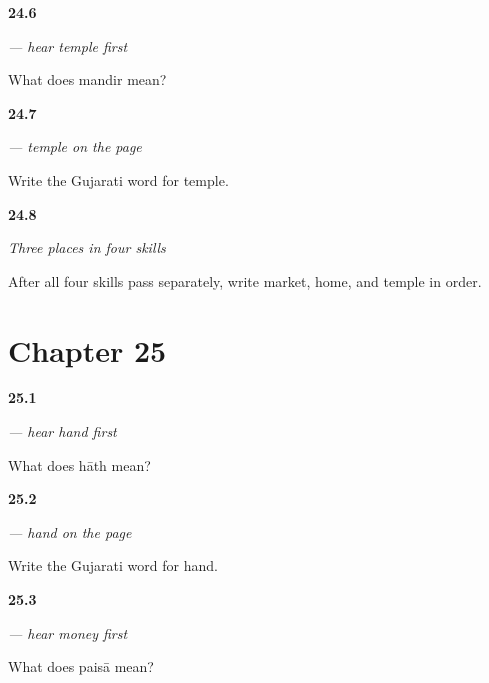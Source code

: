 \noindent\begin{minipage}[t]{\linewidth}
\raggedright
\hypertarget{review-GU-C20-hear-mandir-recall}{\textbf{24.6}} \emph{ — hear temple first}\par
\small What does mandir mean?
\end{minipage}\par\medskip

\noindent\begin{minipage}[t]{\linewidth}
\raggedright
\hypertarget{review-GU-C20-mandir-write}{\textbf{24.7}} \emph{ — temple on the page}\par
\small Write the Gujarati word for temple.
\end{minipage}\par\medskip

\noindent\begin{minipage}[t]{\linewidth}
\raggedright
\hypertarget{review-GU-C20-places-three-payoff}{\textbf{24.8}} \emph{Three places in four skills}\par
\small After all four skills pass separately, write market, home, and temple in order.
\end{minipage}\par\medskip

\section*{Chapter 25}

\noindent\begin{minipage}[t]{\linewidth}
\raggedright
\hypertarget{review-GU-C21-hear-haath-recall}{\textbf{25.1}} \emph{ — hear hand first}\par
\small What does hāth mean?
\end{minipage}\par\medskip

\noindent\begin{minipage}[t]{\linewidth}
\raggedright
\hypertarget{review-GU-C21-haath-write}{\textbf{25.2}} \emph{ — hand on the page}\par
\small Write the Gujarati word for hand.
\end{minipage}\par\medskip

\noindent\begin{minipage}[t]{\linewidth}
\raggedright
\hypertarget{review-GU-C21-hear-paisa-recall}{\textbf{25.3}} \emph{ — hear money first}\par
\small What does paisā mean?
\end{minipage}\par\medskip


